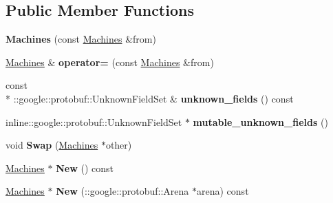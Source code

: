 \subsection*{Public Member Functions}
\begin{DoxyCompactItemize}
\item 
\hypertarget{classmachines_1_1Machines_a292be0e091155d3e56f6bcb4c6fe4016}{{\bfseries Machines} (const \hyperlink{classmachines_1_1Machines}{Machines} \&from)}\label{classmachines_1_1Machines_a292be0e091155d3e56f6bcb4c6fe4016}

\item 
\hypertarget{classmachines_1_1Machines_a965e237f4abb844d6c92a739580a856e}{\hyperlink{classmachines_1_1Machines}{Machines} \& {\bfseries operator=} (const \hyperlink{classmachines_1_1Machines}{Machines} \&from)}\label{classmachines_1_1Machines_a965e237f4abb844d6c92a739580a856e}

\item 
\hypertarget{classmachines_1_1Machines_a2cc3a0c6010471ca3cc9e9ef3cfc03d2}{const \\*
\-::google\-::protobuf\-::\-Unknown\-Field\-Set \& {\bfseries unknown\-\_\-fields} () const }\label{classmachines_1_1Machines_a2cc3a0c6010471ca3cc9e9ef3cfc03d2}

\item 
\hypertarget{classmachines_1_1Machines_a1bb257541a8104e793979c6cb552b586}{inline\-::google\-::protobuf\-::\-Unknown\-Field\-Set $\ast$ {\bfseries mutable\-\_\-unknown\-\_\-fields} ()}\label{classmachines_1_1Machines_a1bb257541a8104e793979c6cb552b586}

\item 
\hypertarget{classmachines_1_1Machines_a1a3bc0fb33034e59799630e9e117340d}{void {\bfseries Swap} (\hyperlink{classmachines_1_1Machines}{Machines} $\ast$other)}\label{classmachines_1_1Machines_a1a3bc0fb33034e59799630e9e117340d}

\item 
\hypertarget{classmachines_1_1Machines_a9299e828801acf217451855f98dc3291}{\hyperlink{classmachines_1_1Machines}{Machines} $\ast$ {\bfseries New} () const }\label{classmachines_1_1Machines_a9299e828801acf217451855f98dc3291}

\item 
\hypertarget{classmachines_1_1Machines_ade18b2a1be4d42b8720d500235bbbb92}{\hyperlink{classmachines_1_1Machines}{Machines} $\ast$ {\bfseries New} (\-::google\-::protobuf\-::\-Arena $\ast$arena) const }\label{classmachines_1_1Machines_ade18b2a1be4d42b8720d500235bbbb92}


\end{DoxyCompactItemize}
